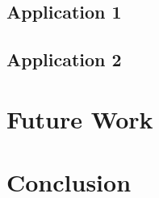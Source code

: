 \documentclass[10pt, letterpaper, twocolumn]{article}
\begin{document}
\subsection{Application 1}

\subsection{Application 2}


\section{Future Work}


\section{Conclusion}



\end{document}
